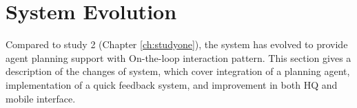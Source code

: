 

\section{System Evolution}\label{sec:studytwosystem}
Compared to study 2 (Chapter \ref{ch:studyone}), the system has evolved to provide agent planning support with On-the-loop interaction pattern. This section gives a description of the changes of system, which cover integration of a planning agent, implementation of a quick feedback system, and improvement in both HQ and mobile interface.

